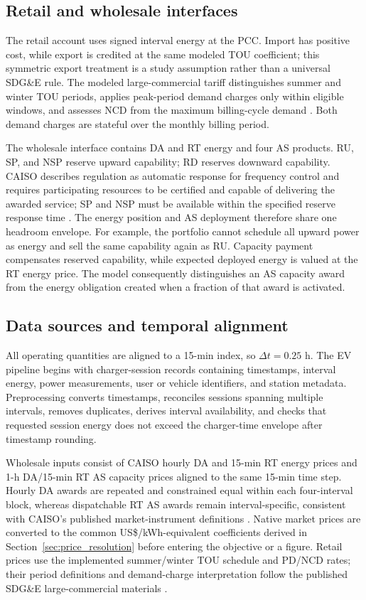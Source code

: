 \documentclass[final,5p,times]{elsarticle}
\newcommand{\dt}{\Delta t}
\begin{document}
\subsection{Retail and wholesale interfaces}
The retail account uses signed interval energy at the PCC. Import has positive cost, while export is credited at the same modeled TOU coefficient; this symmetric export treatment is a study assumption rather than a universal SDG\&E rule. The modeled large-commercial tariff distinguishes summer and winter TOU periods, applies peak-period demand charges only within eligible windows, and assesses NCD from the maximum billing-cycle demand \cite{sdgeLargeCommercial2025,sdgeDemandGuide2026}. Both demand charges are stateful over the monthly billing period.

The wholesale interface contains DA and RT energy and four AS products. RU, SP, and NSP reserve upward capability; RD reserves downward capability. CAISO describes regulation as automatic response for frequency control and requires participating resources to be certified and capable of delivering the awarded service; SP and NSP must be available within the specified reserve response time \cite{caisoAncillary2026}. The energy position and AS deployment therefore share one headroom envelope. For example, the portfolio cannot schedule all upward power as energy and sell the same capability again as RU. Capacity payment compensates reserved capability, while expected deployed energy is valued at the RT energy price. The model consequently distinguishes an AS capacity award from the energy obligation created when a fraction of that award is activated.

\subsection{Data sources and temporal alignment}
All operating quantities are aligned to a 15-min index, so $\dt=0.25$ h. The EV pipeline begins with charger-session records containing timestamps, interval energy, power measurements, user or vehicle identifiers, and station metadata. Preprocessing converts timestamps, reconciles sessions spanning multiple intervals, removes duplicates, derives interval availability, and checks that requested session energy does not exceed the charger-time envelope after timestamp rounding.

Wholesale inputs consist of CAISO hourly DA and 15-min RT energy prices and 1-h DA/15-min RT AS capacity prices aligned to the same 15-min time step. Hourly DA awards are
repeated and constrained equal within each four-interval block, whereas dispatchable RT AS awards remain interval-specific, consistent with CAISO's published market-instrument definitions \cite{caisoMarketInstruments2026,caisoMarketOperations2026}.
Native market prices are converted to the common US\$/kWh-equivalent coefficients derived in Section~\ref{sec:price_resolution} before entering the
objective or a figure. Retail prices use the implemented summer/winter TOU schedule and PD/NCD rates; their period definitions and demand-charge interpretation follow the published SDG\&E large-commercial materials \cite{sdgeLargeCommercial2025,sdgeDemandGuide2026}.
\end{document}
